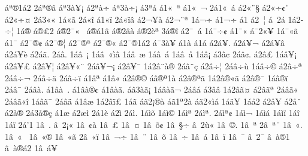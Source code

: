 {^^e1^^aa^^ae1^^e12
2^^e1^^aa^^ae^^e2
^^e1^^aa3^^e0^^a5^^a1
^^e12^^aa^^e0^^f7
^^e1^^aa3^^e0^^f7^^a1
^^e13^^aa^^e1
^^e11^^ab^^a0^^aa
^^e11^^ab^^a0^^ac
2^^e11^^ab^^a0^^e1
^^e12^^ab^^a8^^a7
^^e12^^ab^^f7^^a2'
^^e12^^ab^^f7^^a4
2^^e13^^ab^^ab
1^^e1^^ab^^e3
2^^e1^^ab^^ee
^^e11^^ab^^ef
2^^e1^^ab^^ef^^e2
^^e12^^ac^^a5^^e0
^^e12^^ac^^a8^^aa
1^^e1^^ac^^f7
^^e11^^ac^^f7^^ad
^^e11^^ad
^^e12^^ad^^a0^^a6
^^e1^^ad^^a02^^e1
1^^e12^^ad^^f7^^a6
1^^e1^^ae
^^e1^^ae^^a32
^^e1^^ae2^^af^^ab^^a0
^^e1^^ae^^e11^^e2
^^e1^^ae2^^e2^^e0
^^e1^^ae2^^e8^^aa
3^^e1^^ae^^ee
^^e12^^af^^a0^^e1
1^^e1^^af^^f7^^a2
^^e11^^af^^ab
^^e1^^af2^^ab^^a5
1^^e1^^af^^ab^^e3
^^e11^^af^^ad
^^e12^^af^^ae^^a2
^^e12^^af^^ae^^a6
^^e12^^af^^ae^^aa
^^e12^^af^^ae^^ab
^^e12^^af^^ae1^^e12
^^e1^^af3^^e0^^a5
^^e11^^e0
^^e11^^e1
^^e12^^e1^^a5.
^^e12^^e1^^a5^^ac
^^e12^^e1^^a5^^e2
^^e12^^e1^^a5^^e8
^^e12^^e1^^e3.
2^^e1^^e2.
1^^e1^^e2^^a0^^a1
1^^e1^^e2^^a0^^ab^^ec^^e2
1^^e1^^e2^^a0^^ad^^e6
1^^e1^^e2^^a0^^e1
1^^e1^^e2^^a0^^e5
1^^e1^^e2^^a1
^^e13^^e2^^a2
2^^e1^^e2^^a2.
^^e12^^e2^^a3
1^^e1^^e2^^a5^^a1
^^e12^^e2^^a5^^a3
^^e12^^e2^^a5^^a6
^^e12^^e2^^a5^^ab^^a8
2^^e1^^e2^^a5^^ac^^a1
^^e12^^e2^^a5^^af
1^^e12^^e2^^a8^^e0^^ae
2^^e1^^e2^^a8^^e7
^^e12^^e2^^f7^^a6
2^^e1^^e2^^f7^^f9
1^^e1^^e2^^f7^^a9
^^e12^^e2^^f7^^aa
2^^e1^^e2^^f7^^ac
2^^e1^^e2^^f7^^ad^^e4
2^^e1^^e2^^f7^^ef
^^e11^^e2^^aa
^^e11^^e2^^ab
^^e12^^e2^^ae^^a9
^^e1^^e2^^ae^^aa1^^e0
^^e12^^e2^^ae^^aa^^e3
1^^e12^^e2^^ae^^ab^^e3
^^e12^^e2^^ae^^af^^ad
1^^e1^^e2^^ae^^ef
2^^e1^^e2^^af
2^^e1^^e2^^e0.
^^e11^^e2^^e0^^a0.
^^e11^^e2^^e0^^ae^^a2
^^e11^^e2^^e0^^e3.
^^e1^^e23^^e0^^e3^^a1
1^^e1^^e2^^e0^^e3^^ac
2^^e1^^e2^^e1
^^e13^^e2^^e2
1^^e12^^e2^^e3^^a4
^^e12^^e2^^e3^^aa
2^^e1^^e2^^e3^^ab^^a0
2^^e1^^e2^^e3^^ab^^ee
1^^e1^^e2^^e3^^af
2^^e1^^e2^^e4
^^e11^^e2^^e6
1^^e12^^e2^^ef^^a3
1^^e1^^e3
^^e1^^e32^^a1^^ae^^e0
^^e1^^e31^^aa2^^e0
^^e1^^e32^^ab^^ec^^e1
1^^e1^^e4^^a5
1^^e1^^e52
^^e12^^e5^^a5
^^e12^^e5^^a8
^^e12^^e5^^ae
2^^e13^^e5^^ae^^e7
^^e11^^e6
^^e12^^e6^^ec
2^^e11^^e8
^^e12^^ec
2^^e1^^ec.
1^^e1^^ec^^f5
1^^e1^^ec^^a9
1^^e1^^ec^^aa
2^^e1^^ec^^aa.
2^^e1^^ec^^aa^^a2
1^^e1^^ec^^ac
1^^e1^^ec^^e1
1^^e1^^ec^^ef
1^^e1^^ee
1^^e1^^ef
2^^e1'1
1^^e2^^a0.
^^e2^^a02^^a1^^ab
1^^e2^^a0^^a2^^e0
1^^e2^^a0^^a3
1^^e2^^a0^^a4
1^^e2^^a0^^f5^^a2
1^^e2^^a0^^a7^^f7
^^e2^^a02^^f9^^ab
1^^e2^^a0^^a9.
1^^e2^^a0^^aa
2^^e2^^a0^^aa^^a8
1^^e2^^a0^^ab.
1^^e2^^a0^^ab^^a0
1^^e2^^a0^^ab^^ae
1^^e2^^a0^^ab^^e3
2^^e2^^a0^^ab^^ef
1^^e2^^a0^^ac^^f7
1^^e2^^a0^^ad^^a8
1^^e2^^a0^^ad^^ad^^f5
1^^e2^^a0^^ad^^ad^^f7
1^^e2^^a0^^ad^^e1
1^^e2^^a0^^ad^^ef
1^^e2^^a0^^af
^^e2^^a02^^af^^ad
^^e2^^a0^^e0^^ae1
^^e2^^a0^^e0^^ae^^e12
1^^e2^^a0^^e1^^a5
}
